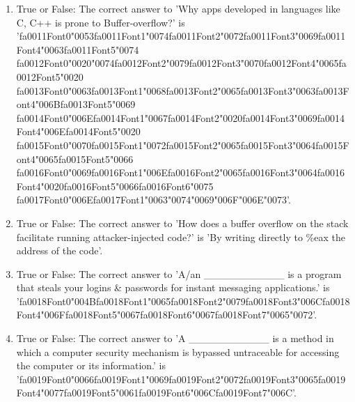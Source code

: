 \documentclass[12pt]{article}
\begin{document}
\begin{enumerate}[label=\arabic*.]
\item True or False: The correct answer to 'Why apps developed in languages like C, C++ is prone to Buffer-overflow?' is '{\csname fa0011Font0\endcsname\char"0053}{\csname fa0011Font1\endcsname\char"0074}{\csname fa0011Font2\endcsname\char"0072}{\csname fa0011Font3\endcsname\char"0069}{\csname fa0011Font4\endcsname\char"0063}{\csname fa0011Font5\endcsname\char"0074} {\csname fa0012Font0\endcsname\char"0020}{\char"0074}{\csname fa0012Font2\endcsname\char"0079}{\csname fa0012Font3\endcsname\char"0070}{\csname fa0012Font4\endcsname\char"0065}{\csname fa0012Font5\endcsname\char"0020} {\csname fa0013Font0\endcsname\char"0063}{\csname fa0013Font1\endcsname\char"0068}{\csname fa0013Font2\endcsname\char"0065}{\csname fa0013Font3\endcsname\char"0063}{\csname fa0013Font4\endcsname\char"006B}{\csname fa0013Font5\endcsname\char"0069} {\csname fa0014Font0\endcsname\char"006E}{\csname fa0014Font1\endcsname\char"0067}{\csname fa0014Font2\endcsname\char"0020}{\csname fa0014Font3\endcsname\char"0069}{\csname fa0014Font4\endcsname\char"006E}{\csname fa0014Font5\endcsname\char"0020} {\csname fa0015Font0\endcsname\char"0070}{\csname fa0015Font1\endcsname\char"0072}{\csname fa0015Font2\endcsname\char"0065}{\csname fa0015Font3\endcsname\char"0064}{\csname fa0015Font4\endcsname\char"0065}{\csname fa0015Font5\endcsname\char"0066} {\csname fa0016Font0\endcsname\char"0069}{\csname fa0016Font1\endcsname\char"006E}{\csname fa0016Font2\endcsname\char"0065}{\csname fa0016Font3\endcsname\char"0064}{\csname fa0016Font4\endcsname\char"0020}{\csname fa0016Font5\endcsname\char"0066}{\csname fa0016Font6\endcsname\char"0075} {\csname fa0017Font0\endcsname\char"006E}{\csname fa0017Font1\endcsname\char"0063}{\char"0074}{\char"0069}{\char"006F}{\char"006E}{\char"0073}'.
\item True or False: The correct answer to 'How does a buffer overflow on the stack facilitate running attacker-injected code?' is 'By writing directly to \%eax the address of the code'.
\item True or False: The correct answer to 'A/an \_\_\_\_\_\_\_\_\_\_\_ is a program that steals your logins \& passwords for instant messaging applications.' is '{\csname fa0018Font0\endcsname\char"004B}{\csname fa0018Font1\endcsname\char"0065}{\csname fa0018Font2\endcsname\char"0079}{\csname fa0018Font3\endcsname\char"006C}{\csname fa0018Font4\endcsname\char"006F}{\csname fa0018Font5\endcsname\char"0067}{\csname fa0018Font6\endcsname\char"0067}{\csname fa0018Font7\endcsname\char"0065}{\char"0072}'.
\item True or False: The correct answer to 'A \_\_\_\_\_\_\_\_\_\_\_ is a method in which a computer security mechanism is bypassed untraceable for accessing the computer or its information.' is '{\csname fa0019Font0\endcsname\char"0066}{\csname fa0019Font1\endcsname\char"0069}{\csname fa0019Font2\endcsname\char"0072}{\csname fa0019Font3\endcsname\char"0065}{\csname fa0019Font4\endcsname\char"0077}{\csname fa0019Font5\endcsname\char"0061}{\csname fa0019Font6\endcsname\char"006C}{\csname fa0019Font7\endcsname\char"006C}'.

\end{enumerate}
\end{document}
